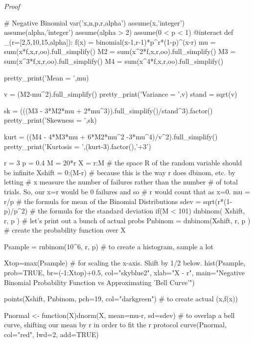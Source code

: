 \documentclass[10pt,]{book}
\makeatletter
\renewcommand*{\proofname}{Proof}
\renewenvironment{proof}[1][\proofname]{\par
  \pushQED{\qed}%
  \normalfont \topsep6\p@\@plus6\p@\relax
  \trivlist
  \item\relax
    {\itshape
    #1\@addpunct{.}}\hspace\labelsep\ignorespaces
}{%
  \popQED\endtrivlist\@endpefalse
}
\numberwithin{equation}{section}
\makeatother
\begin{document}
\begin{proof}\hypertarget{proof-51}{}
\end{proof}
%
\par
\hypertarget{p-995}{}%
\leavevmode%
\begin{sageinput}
# Negative Binomial
var('x,n,p,r,alpha')
assume(x,'integer')
assume(alpha,'integer')
assume(alpha > 2)
assume(0 < p < 1)
@interact
def _(r=[2,5,10,15,alpha]):
    f(x) = binomial(x-1,r-1)*p^r*(1-p)^(x-r)
    mu = sum(x*f,x,r,oo).full_simplify()
    M2 = sum(x^2*f,x,r,oo).full_simplify()
    M3 = sum(x^3*f,x,r,oo).full_simplify()
    M4 = sum(x^4*f,x,r,oo).full_simplify()
        
    pretty_print('Mean = ',mu)
    
    v = (M2-mu^2).full_simplify()
    pretty_print('Variance = ',v)
    stand = sqrt(v)
    
    sk = (((M3 - 3*M2*mu + 2*mu^3)).full_simplify()/stand^3).factor()
    pretty_print('Skewness = ',sk)
    
    kurt = ((M4 - 4*M3*mu + 6*M2*mu^2 -3*mu^4)/v^2).full_simplify()
    pretty_print('Kurtosis = ',(kurt-3).factor(),'+3')
\end{sageinput}
%
\par
\hypertarget{p-996}{}%
\leavevmode%
\begin{sageinput}
r = 3
p = 0.4
M = 20*r
X = r:M    # the space R of the random variable should be infinite 
Xshift = 0:(M-r)   # because this is the way r does dbinom, etc. by letting
                   # x measure the number of failures rather than the number
                   # of total trials.  So, our x=r would be 0 failures and so
                   # r would count that as x=0.
mu = r/p      # the formula for mean of the Binomial Distributions
sdev = sqrt(r*(1-p)/p^2)  # the formula for the standard deviation
if(M < 101){
dnbinom( Xshift, r, p )   # let's print out a bunch of actual probs
}
Pnbinom = dnbinom(Xshift, r, p )  # create the probability function over X

Psample = rnbinom(10^6, r, p)  # to create a histogram, sample a lot

Xtop=max(Psample)          # for scaling the x-axis. Shift by 1/2 below.
hist(Psample, prob=TRUE, br=(-1:Xtop)+0.5, col="skyblue2", xlab="X - r", 
  main="Negative Binomial Probability Function vs Approximating 'Bell Curve'")

points(Xshift, Pnbinom, pch=19, col="darkgreen")  # to create actual (x,f(x))

Pnormal <- function(X){dnorm(X, mean=mu-r, sd=sdev)}   
# to overlap a bell curve, shifting our mean by r in order to fit the r protocol
curve(Pnormal, col="red", lwd=2, add=TRUE)
\end{sageinput}
%
%
%
\typeout{************************************************}
\typeout{************************************************}
%
\end{document}
